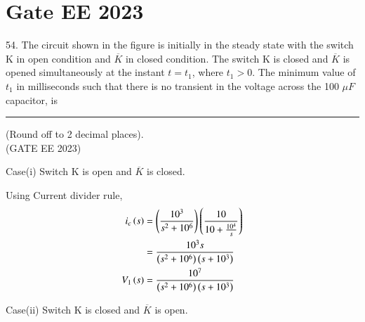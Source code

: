 \documentclass[journal,12pt,twocolumn]{IEEEtran}
\begin{document}


\vspace{3cm}

\title{}
\author{EE23BTECH11054 -  Sai Krishna Shanigarapu$^{*}$
}
\maketitle
\newpage
\bigskip


\section*{Gate EE 2023}
54. \hspace{2pt}The circuit shown in the figure is initially in the steady state with the switch K in open condition and $\overline{K}$ in closed condition. The switch K is closed and $\overline{K}$ is opened simultaneously at the instant $t = t_1$, where $t_1 > 0$. The minimum value of $t_1$ in milliseconds such that there is no transient in the voltage across the 100 $\mu F$ capacitor, is \rule{1cm}{0.15mm} (Round off to 2 decimal places).\\ (GATE EE 2023)

\begin{figure}[h!]
  \centering
  \resizebox{0.8\columnwidth}{!}{}
\end{figure}

\solution

Case(i) Switch K is open and $\overline{K}$ is closed.
\begin{figure}[h!]
  \centering
  \resizebox{0.50\columnwidth}{!}{}
\end{figure}

Using Current divider rule,
\begin{align}
    i_c\left(s\right) &= \left(\frac{10^3}{s^2 + 10^6}\right)\left(\frac{10}{10 + \frac{10^4}{s}}\right)\\
    &= \frac{10^3 s}{\left(s^2 + 10^6\right)\left(s + 10^3\right)}\\
    V_1\left(s\right) &= \frac{10^7}{\left(s^2 + 10^6\right) \left(s + 10^3\right)} 
\end{align}



\newpage
Case(ii) Switch K is closed and $\overline{K}$ is open.

\begin{figure}[h!]
  \centering
  \resizebox{0.55\columnwidth}{!}{}
\end{figure}
\end{document}
